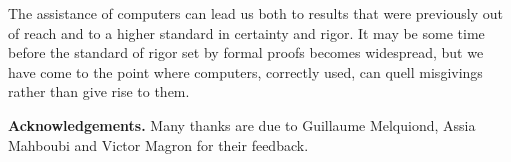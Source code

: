 The assistance of computers can lead us both to results that were previously
out of reach and to a higher standard in certainty and rigor.
It may be some time before the standard of rigor set by formal proofs
becomes widespread, but we have come to the point where computers, correctly
used, can quell misgivings rather than give rise to them. 


{\bf Acknowledgements.} Many thanks are due to Guillaume Melquiond, Assia Mahboubi and Victor Magron for their feedback.
%
%
%

